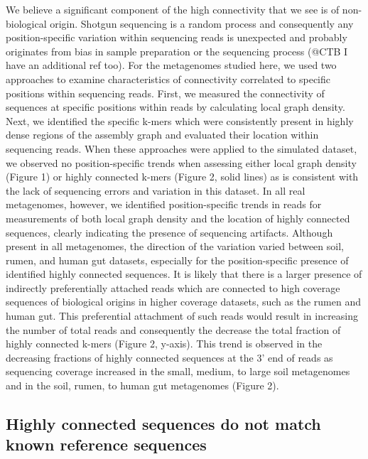 \documentclass[10pt]{article}
\begin{document}

We believe a significant component of the high connectivity that we
see is of non-biological origin.  Shotgun sequencing is a random
process and consequently any position-specific variation within
sequencing reads is unexpected and probably originates from bias in
sample preparation or the sequencing process \cite{GomezAlvarez:2009p1334, Haas:2011jg, Keegan:2012p1336} (@CTB I have an additional ref too).  For the
metagenomes studied here, we used two approaches to examine
characteristics of connectivity correlated to specific positions
within sequencing reads.  First, we measured the connectivity of
sequences at specific positions within reads by calculating local
graph density.  Next, we identified the specific k-mers which were
consistently present in highly dense regions of the assembly graph and
evaluated their location within sequencing reads.  When these
approaches were applied to the simulated dataset, we observed no
position-specific trends when assessing either local graph density
(Figure 1) or highly connected k-mers (Figure 2, solid lines) as is
consistent with the lack of sequencing errors and variation in this
dataset.  In all real metagenomes, however, we identified
position-specific trends in reads for measurements of both local graph density
and the location of highly connected sequences, clearly indicating the
presence of sequencing artifacts.  Although present in all
metagenomes, the direction of the variation varied between soil,
rumen, and human gut datasets, especially for the position-specific
presence of identified highly connected sequences.  It is likely that
there is a larger presence of indirectly preferentially attached reads
which are connected to high coverage sequences of biological origins
in higher coverage datasets, such as the rumen and human gut.  This
preferential attachment of such reads would result in increasing the
number of total reads and consequently the decrease the total fraction
of highly connected k-mers (Figure 2, y-axis).  This trend is observed
in the decreasing fractions of highly connected sequences at the 3'
end of reads as sequencing coverage increased in the small, medium, to
large soil metagenomes and in the soil, rumen, to human gut
metagenomes (Figure 2).

\subsection*{Highly connected sequences do not match known reference sequences}
\end{document}

